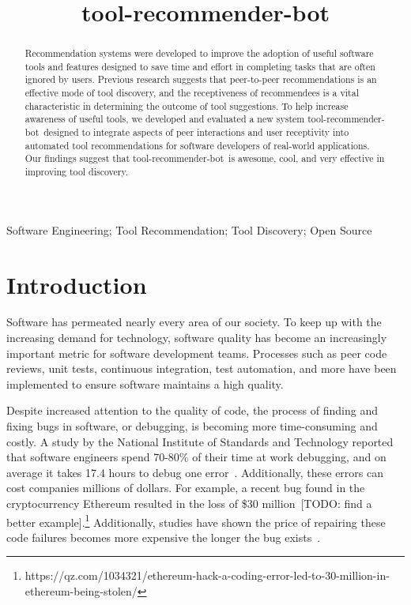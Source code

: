 \documentclass[conference]{IEEEtran}
\newcommand{\tool}{tool-recommender-bot}
\begin{document}

\title{\tool}

\author{
}

\maketitle
\begin{abstract}
Recommendation systems were developed to improve the adoption of useful software tools and features designed to save time and effort in completing tasks that are often ignored by users. Previous research suggests that peer-to-peer recommendations is an effective mode of tool discovery, and the receptiveness of recommendees is a vital characteristic in determining the outcome of tool suggestions. To help increase awareness of useful tools, we developed and evaluated a new system \tool~designed to integrate aspects of peer interactions and user receptivity into automated tool recommendations for software developers of real-world applications. Our findings suggest that \tool~is awesome, cool, and very effective in improving tool discovery.
\end{abstract}

\begin{IEEEkeywords}
Software Engineering; Tool Recommendation; Tool Discovery; Open Source
\end{IEEEkeywords}

\section{Introduction}

Software has permeated nearly every area of our society. To keep up with the increasing demand for technology, software quality has become an increasingly important metric for software development teams. Processes such as peer code reviews, unit tests, continuous integration, test automation, and more have been implemented to ensure software maintains a high quality. 

Despite increased attention to the quality of code, the process of finding and fixing bugs in software, or debugging, is becoming more time-consuming and costly.  A study by the National Institute of Standards and Technology reported that software engineers spend 70-80\% of their time at work debugging, and on average it takes 17.4 hours to debug one error~\cite{NIST}. Additionally, these errors can cost companies millions of dollars.  For example, a recent bug found in the cryptocurrency Ethereum resulted in the loss of \$30 million~[TODO: find a better example].\footnote{https://qz.com/1034321/ethereum-hack-a-coding-error-led-to-30-million-in-ethereum-being-stolen/} Additionally, studies have shown the price of repairing these code failures becomes more expensive the longer the bug exists~\cite{SEEconomics}.
\end{document}
